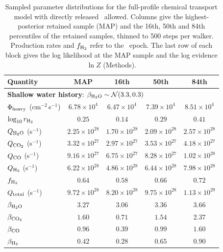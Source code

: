 \begin{table}[!ht]
\centering
\color{blue}
\singlespacing
\footnotesize

\setlength{\tabcolsep}{8pt}
\caption{Sampled parameter distributions for the full-profile chemical transport model with directly released \Htwo\ allowed. Columns give the highest-posterior retained sample (MAP) and the 16th, 50th and 84th percentiles of the retained samples, thinned to 500 steps per walker. Production rates and $f_{\rm H_2}$ refer to the \xmm\ epoch. The last row of each block gives the log likelihood at the MAP sample and the log evidence $\ln Z$ (Methods).}
\begin{tabular}{@{}lcccc@{}}
\toprule
Quantity & MAP & 16th & 50th & 84th\\
\midrule
\multicolumn{5}{l}{\textbf{Shallow water history}: \(\beta_{\rm H_2O}\sim\mathcal N(3.3,0.3)\)}\\
\midrule
\(\Phi_{\rm heavy}\) (cm\(^{-2}\)\,s\(^{-1}\)) & \(6.78\times10^{4}\) & \(6.47\times10^{4}\) & \(7.39\times10^{4}\) & \(8.51\times10^{4}\)\\
\(\log_{10}r_{\rm H_2}\) & \(0.25\) & \(0.14\) & \(0.29\) & \(0.41\)\\
\(Q_{\rm H_2O}\) (s\(^{-1}\)) & \(2.25\times10^{28}\) & \(1.70\times10^{28}\) & \(2.09\times10^{28}\) & \(2.57\times10^{28}\)\\
\(Q_{\rm CO_2}\) (s\(^{-1}\)) & \(3.32\times10^{27}\) & \(2.97\times10^{27}\) & \(3.53\times10^{27}\) & \(4.18\times10^{27}\)\\
\(Q_{\rm CO}\) (s\(^{-1}\)) & \(9.16\times10^{27}\) & \(6.75\times10^{27}\) & \(8.28\times10^{27}\) & \(1.02\times10^{28}\)\\
\(Q_{\rm H_2}\) (s\(^{-1}\)) & \(6.22\times10^{28}\) & \(4.86\times10^{28}\) & \(6.44\times10^{28}\) & \(7.98\times10^{28}\)\\
\(f_{\rm H_2}\) & \(0.64\) & \(0.58\) & \(0.66\) & \(0.72\)\\
\(Q_{\rm total}\) (s\(^{-1}\)) & \(9.72\times10^{28}\) & \(8.20\times10^{28}\) & \(9.75\times10^{28}\) & \(1.13\times10^{29}\)\\
\(\beta_{\rm H_2O}\) & \(3.27\) & \(3.06\) & \(3.36\) & \(3.66\)\\
\(\beta_{\rm CO_2}\) & \(1.60\) & \(0.71\) & \(1.54\) & \(2.37\)\\
\(\beta_{\rm CO}\) & \(0.96\) & \(0.39\) & \(0.99\) & \(1.60\)\\
\(\beta_{\rm H_2}\) & \(0.42\) & \(0.28\) & \(0.65\) & \(0.90\)\\

\end{tabular}
\end{table}
